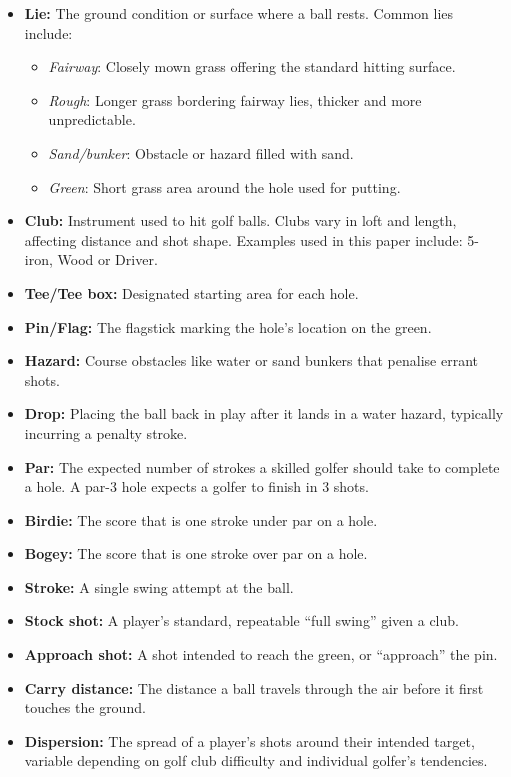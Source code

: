\documentclass[11pt, letterpaper]{article}
\begin{document}
\begin{itemize}[noitemsep]
    \item \textbf{Lie:} The ground condition or surface where a ball rests. Common lies include:
    \begin{itemize}[noitemsep]
        \item\textit{Fairway}: Closely mown grass offering the standard hitting surface.
        \item\textit{Rough}: Longer grass bordering fairway lies, thicker and more unpredictable.
        \item\textit{Sand/bunker}: Obstacle or hazard filled with sand.
        \item\textit{Green}: Short grass area around the hole used for putting.
    \end{itemize}
    \item\textbf{Club:} Instrument used to hit golf balls. Clubs vary in loft and length, affecting distance and shot shape. Examples used in this paper include: 5-iron, Wood or Driver.
    \item\textbf{Tee/Tee box:} Designated starting area for each hole.
    \item\textbf{Pin/Flag:} The flagstick marking the hole's location on the green.
    \item\textbf{Hazard:} Course obstacles like water or sand bunkers that penalise errant shots.
    \item\textbf{Drop:} Placing the ball back in play after it lands in a water hazard, typically incurring a penalty stroke.
    \item \textbf{Par:} The expected number of strokes a skilled golfer should take to complete a hole. A par-3 hole expects a golfer to finish in 3 shots.
    \item \textbf{Birdie:} The score that is one stroke under par on a hole.
    \item \textbf{Bogey:} The score that is one stroke over par on a hole.
    \item\textbf{Stroke:} A single swing attempt at the ball.
    \item\textbf{Stock shot:} A player's standard, repeatable ``full swing'' given a club.
    \item\textbf{Approach shot:} A shot intended to reach the green, or ``approach'' the pin.
    \item \textbf{Carry distance:} The distance a ball travels through the air before it first touches the ground.
    \item \textbf{Dispersion:} The spread of a player’s shots around their intended target, variable depending on golf club difficulty and individual golfer's tendencies.

\end{itemize}
\end{document}
